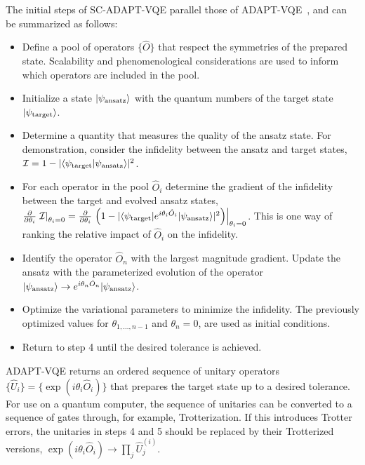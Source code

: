 \documentclass[aps, prc, tightenlines,superscriptaddress, letterpaper, amsmath, amssymb, preprintnumbers, floatfix, longbibliography, nofootinbib]{revtex4-2}
\begin{document}
The initial steps of SC-ADAPT-VQE parallel those of ADAPT-VQE~\cite{Grimsley_2019}, and can be summarized as follows:
%
\begin{itemize}
    \item[1.] Define a pool of operators $\{ \hat{O} \}$ that respect the symmetries of the prepared state. 
    Scalability and phenomenological considerations are used to inform which operators are included in the pool. 
    \item[2.] Initialize a state $\lvert \psi_{{\rm ansatz}}\rangle$ with the quantum numbers of the target state $\lvert \psi_{{\rm target}}\rangle$. 
    \item[3.] Determine a quantity that measures the quality of the ansatz state. 
    For demonstration, consider the infidelity between the ansatz and target states, ${\cal I} = 1 - \vert \langle \psi_{{\rm target}} \vert \psi_{{\rm ansatz}} \rangle \vert ^2$. 
    \item[4.] For each operator in the pool $\hat{O}_i$ determine the gradient of the infidelity between the target and evolved ansatz states, $\frac{\partial}{\partial\theta_i}\left. {\cal I} \right|_{\theta_i=0} = \frac{\partial}{\partial\theta_i} \left.\left( 1 - |\langle\psi_{\rm target} | e^{i \theta_i \hat{O}_i } |\psi_{\rm ansatz}\rangle|^2 \right)\right|_{\theta_i=0}$. 
    This is one way of ranking the relative impact of $\hat{O}_i$ on the infidelity.
    \item[5.] Identify the operator $\hat{O}_n$ with the largest magnitude gradient.
    Update the ansatz with the parameterized evolution of the operator $\lvert \psi_{{\rm ansatz}} \rangle \to e^{i \theta_n \hat{O}_n}\lvert \psi_{{\rm ansatz}} \rangle$.
    \item[6.] Optimize the variational parameters to minimize the infidelity.
    The previously optimized values for $\theta_{1,...,n-1}$ and $\theta_n=0$, are used as initial conditions.
    \item[7.] Return to step 4 until the desired tolerance is achieved.
\end{itemize}
%
ADAPT-VQE returns an ordered sequence of unitary operators $\{ \hat{U}_i \} = \{ {\exp}(i \theta_i \hat{O}_i) \} $ that prepares the target state up to a desired tolerance.
For use on a quantum computer, the sequence of unitaries can be converted to a sequence of gates through, for example, Trotterization.
If this introduces Trotter errors, the unitaries in steps 4 and 5 should be replaced by their Trotterized versions, ${\exp}(i \theta_i \hat{O}_i) \rightarrow \prod\limits_j \hat{U}_j^{(i)}$.
\end{document}
